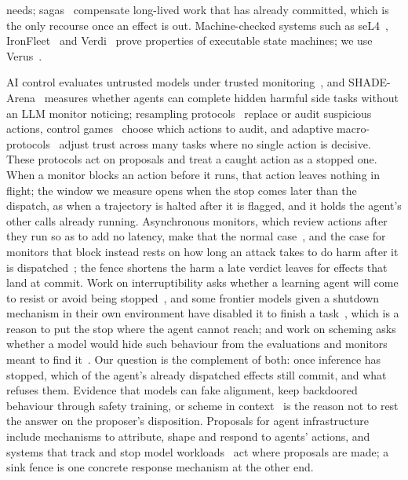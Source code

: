 needs; sagas~\cite{garcia1987sagas} compensate long-lived work that has already committed, which is the only recourse once an effect is out. Machine-checked systems such as seL4~\cite{sel4}, IronFleet~\cite{ironfleet} and Verdi~\cite{verdi} prove properties of executable state machines; we use Verus~\cite{lattuada2023verus,verus}.

 AI control evaluates untrusted models under trusted monitoring~\cite{control,terekhov,makins,metraudit}, and SHADE-Arena~\cite{shadearena} measures whether agents can complete hidden harmful side tasks without an LLM monitor noticing; resampling protocols~\cite{bhatt2025ctrlz} replace or audit suspicious actions, control games~\cite{griffin2024games} choose which actions to audit, and adaptive macro-protocols~\cite{wen2024adaptive} adjust trust across many tasks where no single action is decisive. These protocols act on proposals and treat a caught action as a stopped one. When a monitor blocks an action before it runs, that action leaves nothing in flight; the window we measure opens when the stop comes later than the dispatch, as when a trajectory is halted after it is flagged, and it holds the agent's other calls already running. Asynchronous monitors, which review actions after they run so as to add no latency, make that the normal case~\cite{stickland2025async}, and the case for monitors that block instead rests on how long an attack takes to do harm after it is dispatched~\cite{lucassen2026blocking}; the fence shortens the harm a late verdict leaves for effects that land at commit. Work on interruptibility asks whether a learning agent will come to resist or avoid being stopped~\cite{orseau2016,omohundro2008,soares2015,offswitch}, and some frontier models given a shutdown mechanism in their own environment have disabled it to finish a task~\cite{schlatter2025shutdown}, which is a reason to put the stop where the agent cannot reach; and work on scheming asks whether a model would hide such behaviour from the evaluations and monitors meant to find it~\cite{safetycase,needham,schoen,korbak}. Our question is the complement of both: once inference has stopped, which of the agent's already dispatched effects still commit, and what refuses them. Evidence that models can fake alignment, keep backdoored behaviour through safety training, or scheme in context~\cite{greenblatt2024faking,hubinger2024sleeper,meinke2024scheming} is the reason not to rest the answer on the proposer's disposition. Proposals for agent infrastructure~\cite{chan2025infra} include mechanisms to attribute, shape and respond to agents' actions, and systems that track and stop model workloads~\cite{controlroom} act where proposals are made; a sink fence is one concrete response mechanism at the other end.

